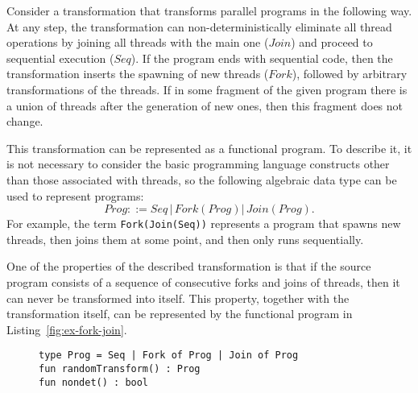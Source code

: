 \begin{example}[$ForkJoin$]\label{ex:fork-join-chcs}
Consider a transformation that transforms parallel programs in the following way.
At any step, the transformation can non-deterministically eliminate all thread operations by joining all threads with the main one ($Join$) and proceed to sequential execution ($Seq$).
If the program ends with sequential code, then the transformation inserts the spawning of new threads ($Fork$), followed by arbitrary transformations of the threads.
If in some fragment of the given program there is a union of threads after the generation of new ones, then this fragment does not change.


This transformation can be represented as a functional program. To describe it, it is not necessary to consider the basic programming language constructs other than those associated with threads, so the following algebraic data type can be used to represent programs:
$$ Prog ::= Seq\,|\,Fork(Prog)|\,Join(Prog). $$
For example, the term \texttt{Fork(Join(Seq))} represents a program that spawns new threads, then joins them at some point, and then only runs sequentially.

One of the properties of the described transformation is that if the source program consists of a sequence of consecutive forks and joins of threads, then it can never be transformed into itself.
This property, together with the transformation itself, can be represented by the functional program in Listing~\ref{fig:ex-fork-join}.
{\renewcommand{\figurename}{Listing}
\begin{figure}
    \centering
\begin{verbatim}
type Prog = Seq | Fork of Prog | Join of Prog
fun randomTransform() : Prog
fun nondet() : bool


\end{verbatim}
\end{figure}}
\end{example}
